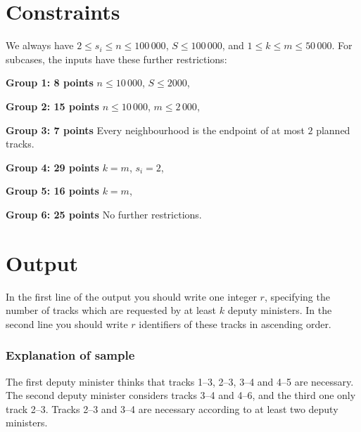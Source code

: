 \section*{Constraints}
We always have $2 \leq s_i \leq n \leq 100\,000$, $S \leq 100\,000$, and $1 \leq k \leq m \leq 50\,000$. For subcases, the inputs have these further restrictions:

\begin{description}
    \item{\textbf{Group 1: 8 points}} $n \leq 10\,000$, $S \leq 2000$,
    \item{\textbf{Group 2: 15 points}} $n \leq 10\,000$, $m \leq 2\,000$,
    \item{\textbf{Group 3: 7 points}} Every neighbourhood is the endpoint of at most $2$ planned tracks.
    \item{\textbf{Group 4: 29 points}} $k = m$, $s_i = 2$,
    \item{\textbf{Group 5: 16 points}} $k = m$, 
    \item{\textbf{Group 6: 25 points}} No further restrictions.
\end{description}


\section*{Output}
In the first line of the output you should write one integer $r$, specifying the number of tracks which are requested by at least $k$ deputy ministers. In the second line you should write $r$ identifiers of these tracks in ascending order.

\subsubsection*{Explanation of sample}

\noindent
The first deputy minister thinks that tracks 1–3, 2–3, 3–4 and 4–5 are necessary. The second deputy minister considers tracks 3–4 and 4–6, and the third one only track 2–3. Tracks
2–3 and 3–4 are necessary according to at least two deputy ministers.

